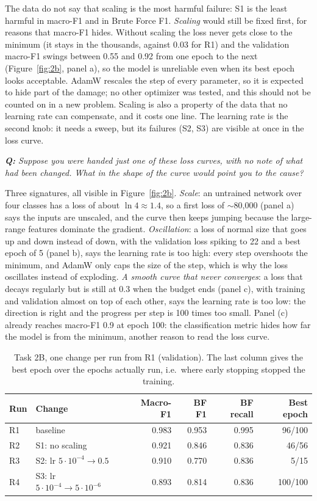 \documentclass[9pt]{extarticle}
\newcommand{\qa}[1]{\par\vspace{2pt}\noindent\textit{\textbf{Q:} #1}\par\nopagebreak\noindent}
\newcommand{\run}[1]{\textsf{#1}}   %
\begin{document}
The data do not say that scaling is the most harmful failure: S1 is the least harmful in macro-F1
and in Brute Force F1. \emph{Scaling} would still be fixed first, for reasons that macro-F1 hides.
Without scaling the loss never gets close to the minimum (it stays in the thousands, against 0.03
for \run{R1}) and the validation macro-F1 swings between 0.55 and 0.92 from one epoch to the next
(Figure~\ref{fig:2b}, panel a), so the model is unreliable even when its best epoch looks acceptable.
AdamW rescales the step of every parameter, so it is expected to hide part of the damage; no other
optimizer was tested, and this should not be counted on in a new problem. Scaling is also a property of
the data that no learning rate can compensate, and it costs one line. The learning rate is the
second knob: it needs a sweep, but its failures (S2, S3) are visible at once in the loss curve.

\qa{Suppose you were handed just one of these loss curves, with no note of what had been changed.
What in the shape of the curve would point you to the cause?}
Three signatures, all visible in Figure~\ref{fig:2b}. \emph{Scale}: an untrained network over four
classes has a loss of about $\ln 4\approx1.4$, so a first loss of $\sim$80,000 (panel a) says the
inputs are unscaled, and the curve then keeps jumping because the large-range features dominate the
gradient. \emph{Oscillation}: a loss of normal size that goes up and down instead of down, with
the validation loss spiking to 22 and a best epoch of 5 (panel b), says the learning rate is too
high: every step overshoots the minimum, and AdamW only caps the size of the step, which is why
the loss oscillates instead of exploding. \emph{A smooth curve that never converges}: a loss that
decays regularly but is still at 0.3 when the budget ends (panel c), with training and validation
almost on top of each other, says the learning rate is too low: the direction is right and the
progress per step is 100 times too small. Panel (c) already reaches macro-F1 0.9 at epoch 100: the
classification metric hides how far the model is from the minimum, another reason to read the loss
curve.

\begin{table}[htbp]
\centering\small
\caption{Task 2B, one change per run from \run{R1} (validation). The last column gives the best epoch
over the epochs actually run, i.e.\ where early stopping stopped the training.}
\label{tab:2b}
\begin{tabular}{@{}llrrrr@{}}
\toprule
Run & Change & Macro-F1 & BF F1 & BF recall & Best epoch\\
\midrule
\run{R1} & baseline                    & 0.983 & 0.953 & 0.995 &  96/100\\
\run{R2} & S1: no scaling              & 0.921 & 0.846 & 0.836 &  46/56\\
\run{R3} & S2: lr $5\cdot10^{-4}\to0.5$  & 0.910 & 0.770 & 0.836 &   5/15\\
\run{R4} & S3: lr $5\cdot10^{-4}\to5\cdot10^{-6}$ & 0.893 & 0.814 & 0.836 & 100/100\\
\bottomrule
\end{tabular}
\end{table}
\end{document}
